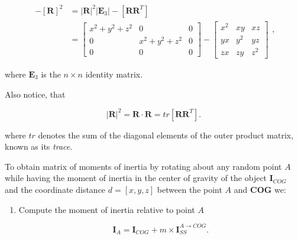 \begin{itemize}
        \begin{equation}
            \begin{array}{ll}
                 \\
                -[\mathbf{R}]^{2}
                &= |\mathbf{R}|^{2}|\mathbf{E}_{3}| - [\mathbf{R}\mathbf{R}^{T}] \\
                &= \begin{bmatrix}
                    x^{2} + y^{2} + z^{2} & 0 & 0 \\
                    0 & x^{2} + y^{2} + z^{2} & 0 \\
                    0 & 0 & 0
                \end{bmatrix} - \begin{bmatrix}
                    x^{2} & xy & xz \\
                    yx & y^{2} & yz \\
                    zx & zy & z^{2}
                \end{bmatrix}
            \end{array}
        ,\end{equation}

        where $\mathbf{E}_{3}$ is the $n \times n$  identity matrix.

        Also notice, that

        \begin{equation}
            |\mathbf{R}|^{2} = \mathbf{R} \cdot \mathbf{R} = tr [\mathbf{R}\mathbf{R}^{T}]
        .\end{equation}

        where $tr$ denotes the sum of the diagonal elements of the outer product
        matrix, known as its \textit{trace}.

        To obtain matrix of moments of inertia by rotating about any random
        point $A$ while having the moment of inertia in the center of gravity of
        the object $\mathbf{I}_{COG}$ and the coordinate distance $d = [x, y, z]$
        between the point $A$ and \textbf{COG} we:

        \begin{enumerate}
            \item Compute the moment of inertia relative to point $A$

                 \begin{equation}
                    \mathbf{I}_{A} = \mathbf{I}_{COG} + m \times \mathbf{I}_{SS}^{A \to COG}
                .\end{equation}


\end{enumerate}
\end{itemize}
